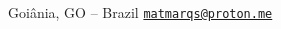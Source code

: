 \documentclass[a4paper]{article}
\makeatletter
\newcommand{\myemail}{\href{mailto:matmarqs@proton.me}{\texttt{matmarqs@proton.me}}}
\newcommand{\mycity}{Goiânia, GO -- Brazil}
\makeatother
\begin{document}
\begin{paracol}{2}
\vspace{2em}

\newlength{\rightcolwidth}
\setlength{\rightcolwidth}{0.75\textwidth}
\begin{minipage}[t]{\rightcolwidth}
\begin{center}\fontfamily{\sfdefault}\selectfont \color{black!70}
{\small
 \mycity \;\;
 \myemail
}
\end{center}
\end{minipage}



\end{paracol}
\end{document}
